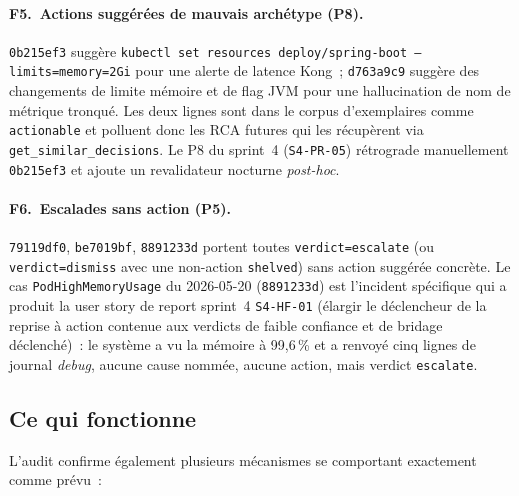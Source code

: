 \documentclass[11pt,a4paper,oneside]{report}
\begin{document}
\paragraph{F5.~Actions suggérées de mauvais archétype (P8).}
\texttt{0b215ef3} suggère \texttt{kubectl set resources
deploy/spring-boot --limits=memory=2Gi} pour une alerte de latence
Kong~; \texttt{d763a9c9} suggère des changements de limite mémoire
et de flag JVM pour une hallucination de nom de métrique tronqué.
Les deux lignes sont dans le corpus d'exemplaires comme
\texttt{actionable} et polluent donc les RCA futures qui les
récupèrent via \texttt{get\_similar\_decisions}. Le P8 du sprint~4
(\texttt{S4-PR-05}) rétrograde manuellement \texttt{0b215ef3} et
ajoute un revalidateur nocturne \emph{post-hoc}.

\paragraph{F6.~Escalades sans action (P5).}
\texttt{79119df0}, \texttt{be7019bf}, \texttt{8891233d} portent
toutes \texttt{verdict=escalate} (ou \texttt{verdict=dismiss} avec
une non-action \texttt{shelved}) sans action suggérée concrète. Le
cas \texttt{PodHighMemoryUsage} du 2026-05-20 (\texttt{8891233d})
est l'incident spécifique qui a produit la user story de report
sprint~4 \texttt{S4-HF-01} (élargir le déclencheur de la reprise à
action contenue aux verdicts de faible confiance et de bridage
déclenché)~: le système a vu la mémoire à 99,6\,\% et a renvoyé
cinq lignes de journal \emph{debug}, aucune cause nommée, aucune
action, mais verdict \texttt{escalate}.

\subsection{Ce qui fonctionne}

L'audit confirme également plusieurs mécanismes se comportant
exactement comme prévu~:
\end{document}
